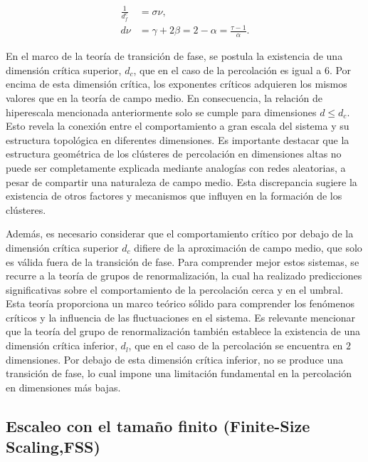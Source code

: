 \begin{align}\label{eq:25}
	\frac{1}{d_f^c} &= \sigma\nu,\\
	d\nu &= \gamma + 2\beta	=2-\alpha=\frac{\tau-1}{\alpha}.
\end{align}

En el marco de la teoría de transición de fase, se postula la existencia de una dimensión crítica superior, $d_c$, que en el caso de la percolación es igual a $6$.  Por encima de esta dimensión crítica, los exponentes críticos adquieren los mismos valores que en la teoría de campo medio. En consecuencia, la relación de hiperescala mencionada anteriormente solo se cumple para dimensiones $d \leq d_c$. Esto revela la conexión entre el comportamiento a gran escala del sistema y su estructura topológica en diferentes dimensiones.  Es importante destacar que la estructura geométrica de los clústeres de percolación en dimensiones altas no puede ser completamente explicada mediante analogías con redes aleatorias, a pesar de compartir una naturaleza de campo medio. Esta discrepancia sugiere la existencia de otros factores y mecanismos que influyen en la formación de los clústeres. 

Además, es necesario considerar que el comportamiento crítico por debajo de la dimensión crítica superior $d_c$ difiere de la aproximación de campo medio, que solo es válida fuera de la transición de fase. Para comprender mejor estos sistemas, se recurre a la teoría de grupos de renormalización, la cual ha realizado predicciones significativas sobre el comportamiento de la percolación cerca y en el umbral. Esta teoría proporciona un marco teórico sólido para comprender los fenómenos críticos y la influencia de las fluctuaciones en el sistema. Es relevante mencionar que la teoría del grupo de renormalización también establece la existencia de una dimensión crítica inferior, $d_l$, que en el caso de la percolación se encuentra en $2$ dimensiones. Por debajo de esta dimensión crítica inferior, no se produce una transición de fase, lo cual impone una limitación fundamental en la percolación en dimensiones más bajas.




\subsection{ Escaleo con el tamaño finito (Finite-Size	Scaling,FSS)}\label{sec:escaleo}



